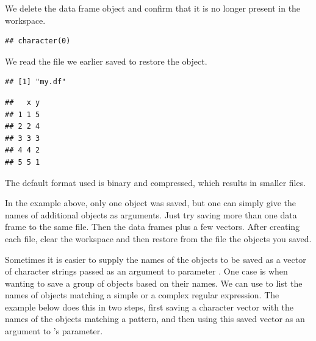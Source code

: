 \documentclass[krantz2]{krantz}\usepackage{knitr}
\begin{document}
We delete the data frame object and confirm that it is no longer present in the workspace.

\begin{knitrout}\footnotesize
{}\color{fgcolor}\begin{kframe}
\begin{alltt}
\hlstd{(} \hlstd{=} \hlstd{)}
\end{alltt}
\begin{verbatim}
## character(0)
\end{verbatim}
\end{kframe}
\end{knitrout}

We read the file we earlier saved to restore the object.

\begin{knitrout}\footnotesize
{}\color{fgcolor}\begin{kframe}
\begin{alltt}
\hlstd{(} \hlstd{=} \hlstd{)}
\hlstd{(} \hlstd{=} \hlstd{)}
\end{alltt}
\begin{verbatim}
## [1] "my.df"
\end{verbatim}
\begin{alltt}
\end{alltt}
\begin{verbatim}
##   x y
## 1 1 5
## 2 2 4
## 3 3 3
## 4 4 2
## 5 5 1
\end{verbatim}
\end{kframe}
\end{knitrout}

The default format used is binary and compressed, which results in smaller files.

\begin{playground}
In the example above, only one object was saved, but one can simply give the names of additional objects as arguments. Just try saving more than one data frame to the same file. Then the data frames plus a few vectors. After creating each file, clear the workspace and then restore from the file the objects you saved.
\end{playground}

Sometimes it is easier to supply the names of the objects to be saved as a vector of character strings passed as an argument to parameter . One case is when wanting to save a group of objects based on their names. We can use  to list the names of objects matching a simple  or a complex regular expression. The example below does this in two steps, first saving a character vector with the names of the objects matching a pattern, and then using this saved vector as an argument to 's  parameter.
\end{document}
